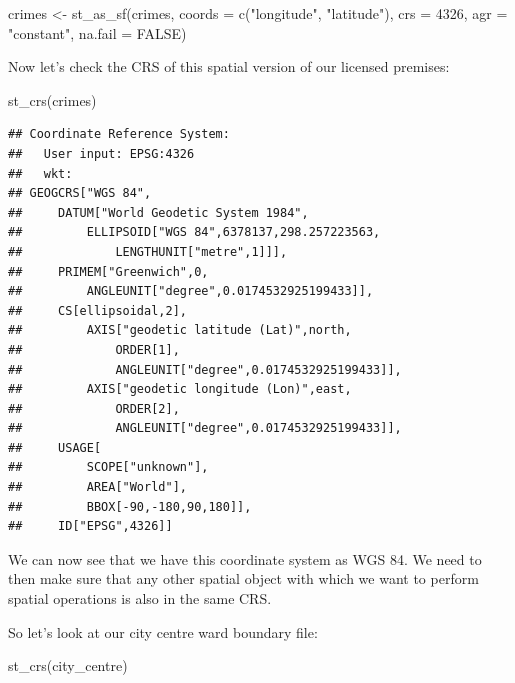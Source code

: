 \documentclass[
]{book}
\makeatletter
\newenvironment{Shaded}{\begin{snugshade}}{\end{snugshade}}
\newcommand{\AttributeTok}[1]{\textcolor[rgb]{0.61,0.61,0.61}{#1}}
\newcommand{\ConstantTok}[1]{\textcolor[rgb]{0,0,0}{#1}}
\newcommand{\DecValTok}[1]{\textcolor[rgb]{0.06,0.06,0.06}{#1}}
\newcommand{\FunctionTok}[1]{\textcolor[rgb]{0,0,0}{#1}}
\newcommand{\NormalTok}[1]{#1}
\newcommand{\OtherTok}[1]{\textcolor[rgb]{0.37,0.37,0.37}{#1}}
\newcommand{\StringTok}[1]{\textcolor[rgb]{0.5,0.5,0.5}{#1}}
\newenvironment{kframe}{%
\medskip{}
\setlength{\fboxsep}{.8em}
 \def\at@end@of@kframe{}%
 \ifinner\ifhmode%
  \def\at@end@of@kframe{\end{minipage}}%
  \begin{minipage}{\columnwidth}%
 \fi\fi%
 \def\FrameCommand##1{\hskip\@totalleftmargin \hskip-\fboxsep
 \colorbox{shadecolor}{##1}\hskip-\fboxsep
     \hskip-\linewidth \hskip-\@totalleftmargin \hskip\columnwidth}%
 \MakeFramed {\advance\hsize-\width
   \@totalleftmargin\z@ \linewidth\hsize
   \@setminipage}}%
 {\par\unskip\endMakeFramed%
 \at@end@of@kframe}
\renewenvironment{Shaded}{\begin{kframe}}{\end{kframe}}
\makeatother
\begin{document}
\begin{Shaded}
\begin{Highlighting}[]
\NormalTok{crimes }\OtherTok{\textless{}{-}} \FunctionTok{st\_as\_sf}\NormalTok{(crimes, }\AttributeTok{coords =} \FunctionTok{c}\NormalTok{(}\StringTok{"longitude"}\NormalTok{, }\StringTok{"latitude"}\NormalTok{), }
                 \AttributeTok{crs =} \DecValTok{4326}\NormalTok{, }\AttributeTok{agr =} \StringTok{"constant"}\NormalTok{, }\AttributeTok{na.fail =} \ConstantTok{FALSE}\NormalTok{)}
\end{Highlighting}
\end{Shaded}

Now let's check the CRS of this spatial version of our licensed premises:

\begin{Shaded}
\begin{Highlighting}[]
\FunctionTok{st\_crs}\NormalTok{(crimes)}
\end{Highlighting}
\end{Shaded}

\begin{verbatim}
## Coordinate Reference System:
##   User input: EPSG:4326 
##   wkt:
## GEOGCRS["WGS 84",
##     DATUM["World Geodetic System 1984",
##         ELLIPSOID["WGS 84",6378137,298.257223563,
##             LENGTHUNIT["metre",1]]],
##     PRIMEM["Greenwich",0,
##         ANGLEUNIT["degree",0.0174532925199433]],
##     CS[ellipsoidal,2],
##         AXIS["geodetic latitude (Lat)",north,
##             ORDER[1],
##             ANGLEUNIT["degree",0.0174532925199433]],
##         AXIS["geodetic longitude (Lon)",east,
##             ORDER[2],
##             ANGLEUNIT["degree",0.0174532925199433]],
##     USAGE[
##         SCOPE["unknown"],
##         AREA["World"],
##         BBOX[-90,-180,90,180]],
##     ID["EPSG",4326]]
\end{verbatim}

We can now see that we have this coordinate system as WGS 84. We need to then make sure that any other spatial object with which we want to perform spatial operations is also in the same CRS.

So let's look at our city centre ward boundary file:

\begin{Shaded}
\begin{Highlighting}[]
\FunctionTok{st\_crs}\NormalTok{(city\_centre)}
\end{Highlighting}
\end{Shaded}
\end{document}
